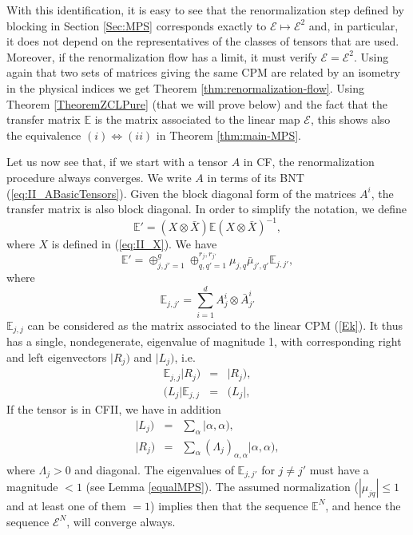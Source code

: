 \documentclass{elsarticle}
\newcommand{\be}{\begin{equation}}
\newcommand{\ee}{\end{equation}}
\newcommand{\bea}{\begin{eqnarray}}
\newcommand{\eea}{\end{eqnarray}}
\begin{document}
With this identification, it is easy to see that the renormalization step defined by blocking in Section \ref{Sec:MPS} corresponds exactly to $\mathcal{E}\mapsto \mathcal{E}^2$ and, in particular, it does not depend on the representatives of the classes of tensors that are used. Moreover, if the renormalization flow has a limit, it must verify $\mathcal{E}= \mathcal{E}^2$. Using again that two sets of matrices giving the same CPM are related by an isometry in the physical indices we get Theorem \ref{thm:renormalization-flow}. Using Theorem \ref{TheoremZCLPure} (that we will prove below) and the fact that the transfer matrix $\mathbb{E}$ is the matrix associated to the linear map $\mathcal{E}$, this shows also the equivalence $(i)\Leftrightarrow (ii)$ in Theorem  \ref{thm:main-MPS}.

Let us now see that, if we start with a tensor $A$ in CF, the renormalization procedure always converges. We write $A$ in terms of its BNT
(\ref{eq:II_ABasicTensors}). Given the block diagonal form of the matrices $A^i$, the transfer matrix is also block diagonal. In order to simplify the notation, we define
 \be
 \label{eq:II_Etilde}
 \mathbb{E}' = \left(X\otimes \bar X\right) \mathbb{E}
 \left(X\otimes \bar X\right)^{-1},
 \ee
where $X$ is defined in (\ref{eq:II_X}). We have
 \be
 \label{EasEkk}
 \mathbb{E}'= \oplus_{j,j'=1}^g \oplus_{q,q'=1}^{r_j, r_{j'}}\mu_{j,q}{\bar\mu_{j',q'}} \mathbb{E}_{j,j'},
 \ee
where
 \be
 \label{Ekk}
 \mathbb{E}_{j,j'} = \sum_{i=1}^d A^i_j \otimes \bar A^i_{j'}
 \ee
$\mathbb{E}_{j,j}$ can be considered as the matrix associated to the linear CPM (\ref{Ek}). It thus has a single, nondegenerate, eigenvalue of magnitude 1, with corresponding right and left eigenvectors $|R_j)$ and $|L_j)$, i.e.
 \begin{subequations}
 \bea
 \mathbb{E}_{j,j} |R_j)&=&|R_j),\\
 (L_j| \mathbb{E}_{j,j} &=&(L_j|,
 \eea
 \end{subequations}
If the tensor is in CFII, we have in addition
 \begin{subequations}
 \bea
 \label{Lk}
 |L_j) &=& \sum_{\alpha} |\alpha,\alpha), \\
 |R_j) &=& \sum_{\alpha} (\Lambda_j)_{\alpha,\alpha} |\alpha,\alpha),
 \eea
 \end{subequations}
where $\Lambda_j>0$ and diagonal. The eigenvalues of $\mathbb{E}_{j,j'}$ for $j\ne j'$ must have a magnitude $< 1$ (see Lemma \ref{equalMPS}).
The assumed normalization ($|\mu_{jq}|\le 1$ and at least one of them $=1$) implies then that the sequence $\mathbb{E}^N$, and hence the sequence $\mathcal{E}^N$, will converge always.
\end{document}
